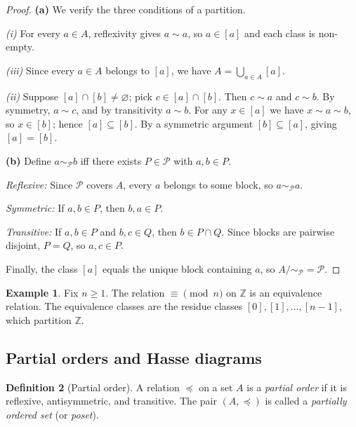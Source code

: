 \documentclass[12pt,a4paper,openany]{book}
\theoremstyle{definition}
\newtheorem{definition}{Definition}[chapter]
\newtheorem{example}[definition]{Example}
\theoremstyle{plain}
\theoremstyle{remark}
\newcommand{\Z}{\mathbb{Z}}
\begin{document}
\begin{proof}
\textbf{(a)}\; We verify the three conditions of a partition.

\emph{(i)}\; For every $a \in A$, reflexivity gives $a \sim a$, so
$a \in [a]$ and each class is non-empty.

\emph{(iii)}\; Since every $a \in A$ belongs to $[a]$, we have
$A = \bigcup_{a \in A} [a]$.

\emph{(ii)}\; Suppose $[a] \cap [b] \neq \varnothing$; pick
$c \in [a] \cap [b]$. Then $c \sim a$ and $c \sim b$. By symmetry,
$a \sim c$, and by transitivity $a \sim b$. For any $x \in [a]$ we have
$x \sim a \sim b$, so $x \in [b]$; hence $[a] \subseteq [b]$. By a
symmetric argument $[b] \subseteq [a]$, giving $[a] = [b]$.

\medskip\noindent
\textbf{(b)}\; Define $a \sim_{\mathcal{P}} b$ iff there exists
$P \in \mathcal{P}$ with $a, b \in P$.

\emph{Reflexive:}\; Since $\mathcal{P}$ covers $A$, every $a$ belongs to
some block, so $a \sim_{\mathcal{P}} a$.

\emph{Symmetric:}\; If $a, b \in P$, then $b, a \in P$.

\emph{Transitive:}\; If $a, b \in P$ and $b, c \in Q$, then $b \in P \cap Q$.
Since blocks are pairwise disjoint, $P = Q$, so $a, c \in P$.

Finally, the class $[a]$ equals the unique block containing $a$, so
$A / {\sim_{\mathcal{P}}} = \mathcal{P}$.
\end{proof}

\begin{example}\label{ex:congruence-equiv}
Fix $n \geq 1$. The relation $\equiv \pmod{n}$ on $\Z$ is an equivalence
relation. The equivalence classes are the residue classes
$[0], [1], \ldots, [n-1]$, which partition $\Z$.
\end{example}

\subsection{Partial orders and Hasse diagrams}
\label{subsec:partial-orders}

\begin{definition}[Partial order]\label{def:partial-order}
A relation $\preceq$ on a set $A$ is a \emph{partial order} if it is
reflexive, antisymmetric, and transitive. The pair $(A, \preceq)$ is called a
\emph{partially ordered set} (or \emph{poset}).
\end{definition}
\end{document}
